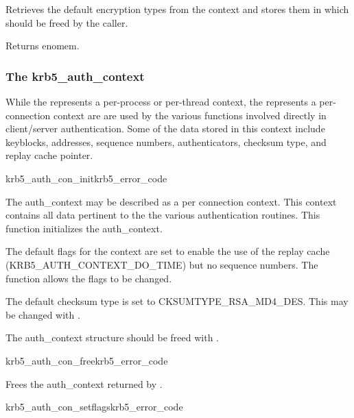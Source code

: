 Retrieves the default encryption types from the context and stores them
in  which should be freed by the caller.

Returns {\sc enomem}.

\subsubsection{The krb5_auth_context}

While the  represents a per-process or per-thread
context, the  represents a per-connection
context are are used by the various functions involved directly in
client/server authentication.  Some of the data stored in this context
include keyblocks, addresses, sequence numbers, authenticators, checksum
type, and replay cache pointer. 

\begin{funcdecl}{krb5_auth_con_init}{krb5_error_code}{\funcinout}
\funcout
{}
\end{funcdecl}

The auth_context may be described as a per connection context. This
context contains all data pertinent to the the various authentication
routines. This function initializes the auth_context. 

The default flags for the context are set to enable the use of the replay cache
(KRB5_AUTH_CONTEXT_DO_TIME) but no sequence numbers. The function
 allows the flags to be changed.

The default checksum type is set to CKSUMTYPE_RSA_MD4_DES. This may be
changed with .

The auth_context structure should be freed with
.

\begin{funcdecl}{krb5_auth_con_free}{krb5_error_code}{\funcinout}
\end{funcdecl}

Frees the auth_context  returned by
.


\begin{funcdecl}{krb5_auth_con_setflags}{krb5_error_code}{\funcinout}
\funcin
{}
\end{funcdecl}

